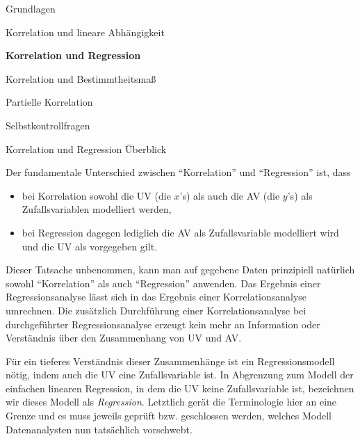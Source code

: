 \documentclass[
  8pt,
  ignorenonframetext,
]{beamer}
\providecommand{\tightlist}{%
  \setlength{\itemsep}{0pt}\setlength{\parskip}{0pt}}
\begin{document}
\begin{frame}{}
\protect\hypertarget{section-6}{}
\vfill
\large

Grundlagen

Korrelation und lineare Abhängigkeit

\textbf{Korrelation und Regression}

Korrelation und Bestimmtheitsmaß

Partielle Korrelation

Selbstkontrollfragen

\vfill
\end{frame}

\begin{frame}{Korrelation und Regression}
\protect\hypertarget{korrelation-und-regression}{}
Überblick

\footnotesize

Der fundamentale Unterschied zwischen ``Korrelation'' und ``Regression''
ist, dass

\begin{itemize}
\tightlist
\item
  bei Korrelation sowohl die UV (die \(x\)'s) als auch die AV (die
  \(y\)'s) als Zufallsvariablen modelliert werden,
\item
  bei Regression dagegen lediglich die AV als Zufallsvariable modelliert
  wird und die UV als vorgegeben gilt.
\end{itemize}

Dieser Tatsache unbenommen, kann man auf gegebene Daten prinzipiell
natürlich sowohl ``Korrelation'' als auch ``Regression'' anwenden. Das
Ergebnis einer Regressionsanalyse lässt sich in das Ergebnis einer
Korrelationsanalyse umrechnen. Die zusätzlich Durchführung einer
Korrelationsanalyse bei durchgeführter Regressionsanalyse erzeugt kein
mehr an Information oder Verständnis über den Zusammenhang von UV und
AV.

Für ein tieferes Verständnis dieser Zusammenhänge ist ein
Regressionsmodell nötig, indem auch die UV eine Zufallsvariable ist. In
Abgrenzung zum Modell der einfachen linearen Regression, in dem die UV
keine Zufallsvariable ist, bezeichnen wir dieses Modell als
\textit{Regression}. Letztlich gerät die Terminologie hier an eine
Grenze und es muss jeweils geprüft bzw. geschlossen werden, welches
Modell Datenanalysten nun tatsächlich vorschwebt.
\end{frame}
\end{document}
